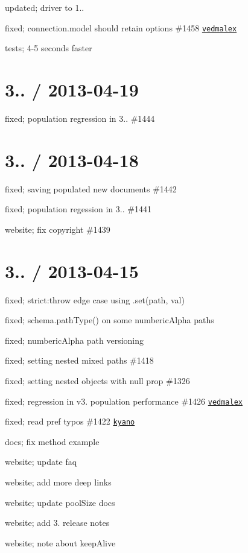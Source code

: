 \begin{DoxyItemize}
\item updated; driver to 1..
\item fixed; connection.\+model should retain options \#1458 \href{https://github.com/vedmalex}{\tt vedmalex}
\item tests; 4-\/5 seconds faster
\end{DoxyItemize}

\section*{3.. / 2013-\/04-\/19 }


\begin{DoxyItemize}
\item fixed; population regression in 3.. \#1444
\end{DoxyItemize}

\section*{3.. / 2013-\/04-\/18 }


\begin{DoxyItemize}
\item fixed; saving populated new documents \#1442
\item fixed; population regession in 3.. \#1441
\item website; fix copyright \#1439
\end{DoxyItemize}

\section*{3.. / 2013-\/04-\/15 }


\begin{DoxyItemize}
\item fixed; strict\+:throw edge case using .set(path, val)
\item fixed; schema.\+path\+Type() on some numberic\+Alpha paths
\item fixed; numberic\+Alpha path versioning
\item fixed; setting nested mixed paths \#1418
\item fixed; setting nested objects with null prop \#1326
\item fixed; regression in v3. population performance \#1426 \href{https://github.com/vedmalex}{\tt vedmalex}
\item fixed; read pref typos \#1422 \href{https://github.com/kyano}{\tt kyano}
\item docs; fix method example
\item website; update faq
\item website; add more deep links
\item website; update pool\+Size docs
\item website; add 3. release notes
\item website; note about keep\+Alive
\end{DoxyItemize}

